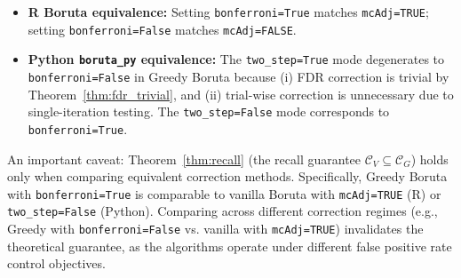 \documentclass[runningheads]{llncs}
\newcommand{\writeme}[1]{\todo[inline,color=yellow!40]{WRITE: #1}}
\begin{document}
\begin{itemize}
    \item \textbf{R Boruta equivalence:} Setting \texttt{bonferroni=True} matches \texttt{mcAdj=TRUE}; setting \texttt{bonferroni=False} matches \texttt{mcAdj=FALSE}.
    \item \textbf{Python \texttt{boruta\_py} equivalence:} The \texttt{two\_step=True} mode degenerates to \texttt{bonferroni=False} in Greedy Boruta because (i) FDR correction is trivial by Theorem~\ref{thm:fdr_trivial}, and (ii) trial-wise correction is unnecessary due to single-iteration testing. The \texttt{two\_step=False} mode corresponds to \texttt{bonferroni=True}.
\end{itemize}

An important caveat: Theorem~\ref{thm:recall} (the recall guarantee $\mathcal{C}_V \subseteq \mathcal{C}_G$) holds only when comparing equivalent correction methods. Specifically, Greedy Boruta with \texttt{bonferroni=True} is comparable to vanilla Boruta with \texttt{mcAdj=TRUE} (R) or \texttt{two\_step=False} (Python). Comparing across different correction regimes (e.g., Greedy with \texttt{bonferroni=False} vs. vanilla with \texttt{mcAdj=TRUE}) invalidates the theoretical guarantee, as the algorithms operate under different false positive rate control objectives.


\end{document}
